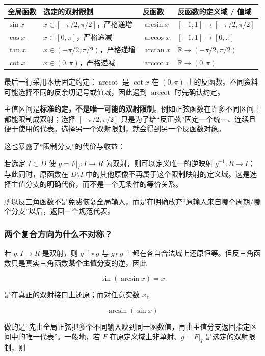 \documentclass[11pt,a4paper]{ctexart}
\begin{document}
\begin{center}
\begin{tabularx}{\linewidth}{L{2.2cm}L{4.5cm}L{2.6cm}Y}
\toprule
全局函数 & 选定的双射限制 & 反函数 & 反函数的定义域 / 值域 \\
\midrule
\(\sin x\) & \(x\in[-\pi/2,\pi/2]\)，严格递增 & \(\arcsin x\) & \([-1,1]\to[-\pi/2,\pi/2]\) \\
\(\cos x\) & \(x\in[0,\pi]\)，严格递减 & \(\arccos x\) & \([-1,1]\to[0,\pi]\) \\
\(\tan x\) & \(x\in(-\pi/2,\pi/2)\)，严格递增 & \(\arctan x\) & \(\mathbb R\to(-\pi/2,\pi/2)\) \\
\(\cot x\) & \(x\in(0,\pi)\)，严格递减 & \(\operatorname{arccot}x\) & \(\mathbb R\to(0,\pi)\) \\
\bottomrule
\end{tabularx}
\end{center}

最后一行采用本册固定约定：\(\operatorname{arccot}\) 是 \(\cot x\) 在 \((0,\pi)\) 上的反函数。不同资料可能选择不同的反余切记号或值域，因此遇到 \(\operatorname{arccot}\) 时先确认约定。

主值区间是\textbf{标准约定，不是唯一可能的双射限制}。例如正弦函数在许多不同区间上都能限制成双射；选择 \([-\pi/2,\pi/2]\) 只是为了给“反正弦”固定一个统一、连续且便于使用的代表。选择另一个双射限制，就会得到另一个反函数对象。

这也暴露了“限制分支”的代价与收益：

若选定 \(I\subset D\) 使 \(g=F\vert_I:I\to R\) 为双射，则可以定义唯一的逆映射 \(g^{-1}:R\to I\)；与此同时，原函数在 \(D\setminus I\) 中的其他原像不再属于这个限制映射的定义域。这是选择主值分支的明确代价，而不是一个无条件的等价关系。

所以反三角函数不是免费恢复全局输入，而是在明确放弃“原输入来自哪个周期/哪个分支”以后，返回一个规范代表。

\subsubsection{两个复合方向为什么不对称？}

若 $g:I\to R$ 是双射，则 $g^{-1}\circ g$ 与 $g\circ g^{-1}$ 都在各自合法域上还原恒等。但反三角函数只是真实三角函数\textbf{某个主值分支}的逆，因此

\[
\sin(\arcsin x)=x
\]

是在真正的双射接口上还原；而对任意实数 $x$，

\[
\arcsin(\sin x)
\]

做的是“先由全局正弦把多个不同输入映到同一函数值，再由主值分支返回指定区间中的唯一代表”。一般地，若 $F$ 在原定义域上非单射、$g=F\vert_I$ 是选定的双射限制，则
\end{document}

